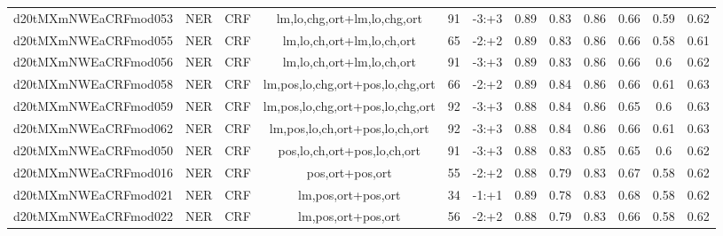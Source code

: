 \documentclass[a4paper]{article}
\begin{document}
\begin{landscape}
\begin{center}
\begin{tabular}{ |c|c|c|c|c|c|c|c|c|c|c|c|}
 
 	
 	\small{ d20tMXmNWEaCRFmod053 } & NER & CRF & lm,lo,chg,ort+lm,lo,chg,ort  &  91 &  -3:+3  &  0.89 & 0.83 & 0.86  &  0.66 & 0.59 & 0.62 \\
 	

 
 	
 	\small{ d20tMXmNWEaCRFmod055 } & NER & CRF & lm,lo,ch,ort+lm,lo,ch,ort  &  65 &  -2:+2  &  0.89 & 0.83 & 0.86  &  0.66 & 0.58 & 0.61 \\
 	

 
 	
 	\small{ d20tMXmNWEaCRFmod056 } & NER & CRF & lm,lo,ch,ort+lm,lo,ch,ort  &  91 &  -3:+3  &  0.89 & 0.83 & 0.86  &  0.66 & 0.6 & 0.62 \\
 	

 
 	
 	\small{ d20tMXmNWEaCRFmod058 } & NER & CRF & lm,pos,lo,chg,ort+pos,lo,chg,ort  &  66 &  -2:+2  &  0.89 & 0.84 & 0.86  &  0.66 & 0.61 & 0.63 \\
 	

 
 	
 	\small{ d20tMXmNWEaCRFmod059 } & NER & CRF & lm,pos,lo,chg,ort+pos,lo,chg,ort  &  92 &  -3:+3  &  0.88 & 0.84 & 0.86  &  0.65 & 0.6 & 0.63 \\
 	

 
 	
 	\small{ d20tMXmNWEaCRFmod062 } & NER & CRF & lm,pos,lo,ch,ort+pos,lo,ch,ort  &  92 &  -3:+3  &  0.88 & 0.84 & 0.86  &  0.66 & 0.61 & 0.63 \\
 	

 
 	
 	\small{ d20tMXmNWEaCRFmod050 } & NER & CRF & pos,lo,ch,ort+pos,lo,ch,ort  &  91 &  -3:+3  &  0.88 & 0.83 & 0.85  &  0.65 & 0.6 & 0.62 \\
 	

 
 	
 	\small{ d20tMXmNWEaCRFmod016 } & NER & CRF & pos,ort+pos,ort  &  55 &  -2:+2  &  0.88 & 0.79 & 0.83  &  0.67 & 0.58 & 0.62 \\
 	

 
 	
 	\small{ d20tMXmNWEaCRFmod021 } & NER & CRF & lm,pos,ort+pos,ort  &  34 &  -1:+1  &  0.89 & 0.78 & 0.83  &  0.68 & 0.58 & 0.62 \\
 	

 
 	
 	\small{ d20tMXmNWEaCRFmod022 } & NER & CRF & lm,pos,ort+pos,ort  &  56 &  -2:+2  &  0.88 & 0.79 & 0.83  &  0.66 & 0.58 & 0.62 \\
 	


\end{tabular}
\end{center}
\end{landscape}
\end{document}
